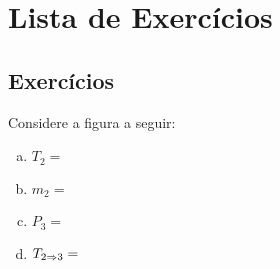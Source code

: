 \chapter{Lista de Exercícios}

\section{Exercícios}

\begin{Exerc}[9.69 6\pa Ed.]
Considere a figura a seguir:

 
\begin{enumerate}[a)]
  \item $T_2 =$
  \item $m_2 =$
  \item $P_3 =$
  \item $T_{2 \Rightarrow 3} =$
\end{enumerate}
\end{Exerc}

